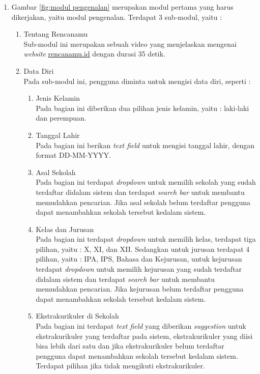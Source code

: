 \begin{enumerate}
    \item Gambar \ref{fig:modul pengenalan} merupakan modul pertama yang harus dikerjakan, yaitu modul pengenalan. Terdapat 3 sub-modul, yaitu : 
    \begin{enumerate}
        \item Tentang Rencanamu \\
            Sub-modul ini merupakan sebuah video yang menjelaskan mengenai \textit{website} \url{rencanamu.id} dengan durasi 35 detik.
            
        \item Data Diri \\
            Pada sub-modul ini, pengguna diminta untuk mengisi data diri, seperti :
            \begin{enumerate}
                \item Jenis Kelamin \\
                    Pada bagian ini diberikan dua pilihan jenis kelamin, yaitu : laki-laki dan perempuan.
                    
                \item Tanggal Lahir\\
                    Pada bagian ini berikan \textit{text field} untuk mengisi tanggal lahir, dengan format DD-MM-YYYY.
                    
                \item Asal Sekolah \\
                    Pada bagian ini terdapat \textit{dropdown} untuk memilih sekolah yang sudah terdaftar didalam sistem dan terdapat \textit{search bar} untuk membantu memudahkan pencarian. Jika asal sekolah belum terdaftar pengguna dapat menambahkan sekolah tersebut kedalam sistem.
                    
                \item Kelas dan Jurusan \\
                    Pada bagian ini terdapat \textit{dropdown} untuk memilih kelas, terdapat tiga pilihan, yaitu : X, XI, dan XII. Sedangkan untuk jurusan terdapat 4 pilihan, yaitu : IPA, IPS, Bahasa dan Kejurusan, untuk kejurusan terdapat \textit{dropdown} untuk memilih kejurusan yang sudah terdaftar didalam sistem dan terdapat \textit{search bar} untuk membantu memudahkan pencarian. Jika kejurusan belum terdaftar pengguna dapat menambahkan sekolah tersebut kedalam sistem.
                    
                \item Ekstrakurikuler di Sekolah \\
                    Pada bagian ini terdapat \textit{text field} yang diberikan \textit{suggestion} untuk ekstrakurikuler yang terdaftar pada sistem, ekstrakurikuler yang diisi bisa lebih dari satu dan jika ekstrakurikuler belum terdaftar pengguna dapat menambahkan sekolah tersebut kedalam sistem. Terdapat pilihan jika tidak mengikuti ekstrakurikuler.
                    

\end{enumerate}
\end{enumerate}
\end{enumerate}
